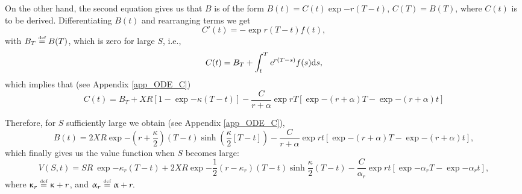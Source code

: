 On the other hand, the second equation gives us that $B$ is of the form $B(t) = C(t) \exp{-r (T-t)}$, $C(T) = B(T)$, where $C(t)$ is to be derived. Differentiating $B(t)$ and rearranging terms we get
	\begin{equation}\label{C_ode}
		C'(t) = - \exp{r(T-t)}f(t), 
	\end{equation}
with $  B_T \overset{\text{\tiny def}}{=} B(T) $, which is zero for large $S$, i.e.,
	\begin{equation}\label{C_ode_sol}
		 C(t) 	= B_T + \int_t^T \text{\sl e}^{r(T-s)}f(s)\text{\rm d} s,
	\end{equation}
which implies that (see Appendix \ref{app_ODE_C})
	\begin{equation}
		C(t) = B_T + {X R}  \left[1 -  \exp{-\kappa(T-t)}\right]- \frac{C}{r+\alpha}\exp{rT}\left[\exp{-(r+\alpha)T}-\exp{-(r+\alpha)t}\right]
	\end{equation}

Therefore, for $S$ sufficiently large we obtain (see Appendix \ref{app_ODE_C}),
	\begin{equation}\label{B}
			B(t)  = {2X R}\exp{-\left(r+\frac{\kappa}{2}\right)(T-t)}\sinh\left(\frac{\kappa}{2}[T-t]\right)- \frac{C}{r+\alpha}\exp{rt}\left[\exp{-(r+\alpha)T}-\exp{-(r+\alpha)t}\right],
	\end{equation}
which finally gives us the value function when $S$ becomes large:
	\begin{equation}\label{boundary_formula}
		V(S,t) = SR  \ \exp{-\kappa_r(T-t)} +  {2X R}\exp{-\frac{1}{2}\left(r-\kappa_r\right)(T-t)}\sinh \frac{\kappa}{2}(T-t)- \frac{C}{\alpha_r}\exp{rt}\left[\exp{-\alpha_r T}-\exp{-\alpha_r t}\right],
	\end{equation}
	where $\upkappa_r \overset{\text{\tiny def}}{=} \upkappa + r$, and $\upalpha_r \overset{\text{\tiny def}}{=}  \upalpha + r.$
